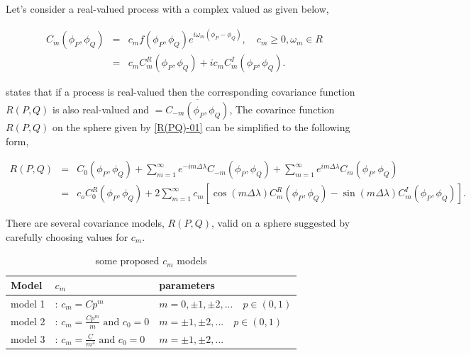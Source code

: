 		
Let's consider a real-valued process with a complex valued \Cm as given below,

\begin{eqnarray*}
C_m(\phi_P,\phi_Q) &=& c_m f(\phi_P,\phi_Q)e^{i\omega_m(\phi_P-\phi_Q)}, \quad c_m \ge 0,\omega_m\in R \\
 &=& c_mC_m^{R}(\phi_P,\phi_Q) + i c_mC_m^{I}(\phi_P,\phi_Q).
\end{eqnarray*}

		\cite{Huang2012} states that if a process is real-valued then the corresponding covariance function $R(P,Q)$ is also real-valued and \Cm $= \overline{C_{-m}(\phi_P,\phi_Q)}$, The covarince function $R(P,Q)$ on the sphere given by \ref{R(PQ)-01} can be simplified to the following form,
		

\begin{eqnarray*}
R(P,Q) &=& C_0(\phi_P,\phi_Q) + \sum_{m=1}^{\infty} e^{-im\Delta\lambda}C_{-m}(\phi_P,\phi_Q) +  \sum_{m=1}^{\infty} e^{im\Delta\lambda}C_m(\phi_P,\phi_Q) \\ 
 &=& c_oC_{0}^{R}(\phi_P,\phi_Q)+2 \sum_{m=1}^{\infty}c_m[\cos(m\Delta\lambda)C_{m}^{R}(\phi_P,\phi_Q)-\sin(m\Delta\lambda)C_{m}^{I}(\phi_P,\phi_Q)].
\end{eqnarray*}


		There are several covariance models, $R(P,Q)$, valid on a sphere suggested by \cite{Huang2012}  carefully choosing values for $c_m$.
		
		
		\begin{table}[H]
			\centering
			\begin{tabular}{l|l|l}
				\hline
				Model   & $c_m$                                            & parameters                                \\ 
				\hline \hline
				model 1 & : $c_m = Cp^m$                                & $m=0, \pm 1, \pm 2,... \quad p\in (0,1)$ \\
				model 2 & : $c_m = \frac{Cp^m}{m} \mbox{ and } c_0 = 0$ & $m=\pm 1, \pm 2,... \quad p\in (0,1)$    \\
				model 3 & : $c_m = \frac{C}{m^4} \mbox{ and } c_0 = 0$  & $m=\pm 1, \pm 2,...$                     \\
				\hline
			\end{tabular}
			\caption{some proposed $c_m$ models}
		\end{table}
			
